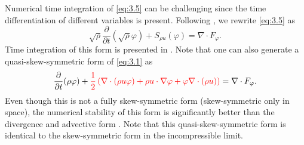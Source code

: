 Numerical time integration of \eqref{eq:3.5} can be challenging since the time differentiation of different variables is present. Following \cite{morinishi2010skew}, we rewrite \eqref{eq:3.5} as
\begin{equation} \label{eq:3.6}
	\sqrt{\rho } \frac{\partial }{\partial t} (\sqrt \rho \varphi ) + S_{\rho u}(\varphi) = \nabla \cdot F_{\varphi}.
\end{equation}
Time integration of this form is presented in \cite{morinishi2010skew,reiss2014conservative}. Note that one can also generate a quasi-skew-symmetric form \cite{blaisdell1991numerical,morinishi2003dns} of \eqref{eq:3.1} as
\begin{equation} \label{eq:3.7}
	\frac{\partial }{\partial t} (\rho \varphi) + \edit{ \frac 1 2 \left( \nabla \cdot(\rho u \varphi) + \rho u \cdot \nabla \varphi + \varphi \nabla \cdot(\rho u) \right) } = \nabla \cdot F_{\varphi}.
\end{equation}
Even though this is not a fully skew-symmetric form (skew-symmetric only in space), the numerical stability of this form is significantly better than the divergence and advective form \cite{morinishi2010skew,blaisdell1991numerical,morinishi2003dns}. Note that this quasi-skew-symmetric form is identical to the skew-symmetric form in the incompressible limit.

